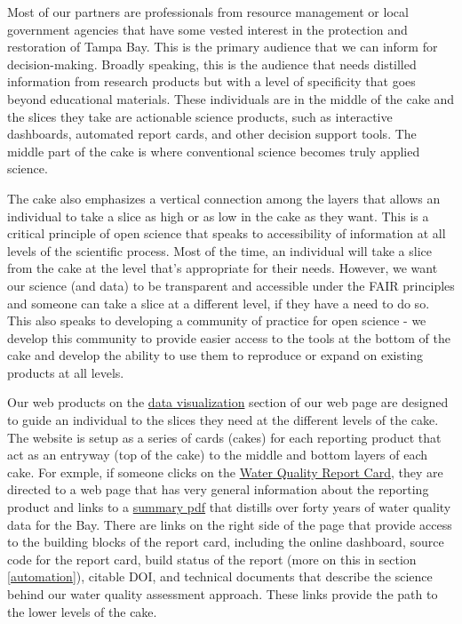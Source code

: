\documentclass[
]{book}
\begin{document}
Most of our partners are professionals from resource management or local government agencies that have some vested interest in the protection and restoration of Tampa Bay. This is the primary audience that we can inform for decision-making. Broadly speaking, this is the audience that needs distilled information from research products but with a level of specificity that goes beyond educational materials. These individuals are in the middle of the cake and the slices they take are actionable science products, such as interactive dashboards, automated report cards, and other decision support tools. The middle part of the cake is where conventional science becomes truly applied science.

The cake also emphasizes a vertical connection among the layers that allows an individual to take a slice as high or as low in the cake as they want. This is a critical principle of open science that speaks to accessibility of information at all levels of the scientific process. Most of the time, an individual will take a slice from the cake at the level that's appropriate for their needs. However, we want our science (and data) to be transparent and accessible under the FAIR principles and someone can take a slice at a different level, if they have a need to do so. This also speaks to developing a community of practice for open science - we develop this community to provide easier access to the tools at the bottom of the cake and develop the ability to use them to reproduce or expand on existing products at all levels.

Our web products on the \href{https://tbep.org/our-work/data-vizualization/}{data visualization} section of our web page are designed to guide an individual to the slices they need at the different levels of the cake. The website is setup as a series of cards (cakes) for each reporting product that act as an entryway (top of the cake) to the middle and bottom layers of each cake. For exmple, if someone clicks on the \href{https://tbep.org/water-quality-report-card/}{Water Quality Report Card}, they are directed to a web page that has very general information about the reporting product and links to a \href{https://drive.google.com/file/d/124FXmLcXKYUf3ktaVOvFejndiPS0m7K7/view?usp=sharing}{summary pdf} that distills over forty years of water quality data for the Bay. There are links on the right side of the page that provide access to the building blocks of the report card, including the online dashboard, source code for the report card, build status of the report (more on this in section \ref{automation}), citable DOI, and technical documents that describe the science behind our water quality assessment approach. These links provide the path to the lower levels of the cake.
\end{document}
